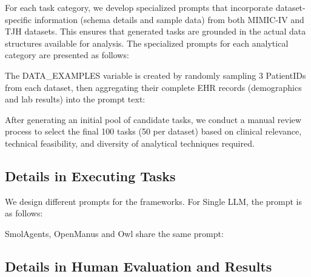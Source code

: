 \documentclass{article}
\begin{document}


For each task category, we develop specialized prompts that incorporate dataset-specific information (schema details and sample data) from both MIMIC-IV and TJH datasets. This ensures that generated tasks are grounded in the actual data structures available for analysis. 
The specialized prompts for each analytical category are presented as follows:










The DATA\_EXAMPLES variable is created by randomly sampling 3 PatientIDs from each dataset, then aggregating their complete EHR records (demographics and lab results) into the prompt text:



After generating an initial pool of candidate tasks, we conduct a manual review process to select the final 100 tasks (50 per dataset) based on clinical relevance, technical feasibility, and diversity of analytical techniques required.



\subsection{Details in Executing Tasks}
\label{sec:app_task4_executing_tasks_details}

We design different prompts for the frameworks. For Single LLM, the prompt is as follows:



SmolAgents, OpenManus and Owl share the same prompt:



\subsection{Details in Human Evaluation and Results}
\label{sec:app_task4_human_eval_details}
\end{document}
